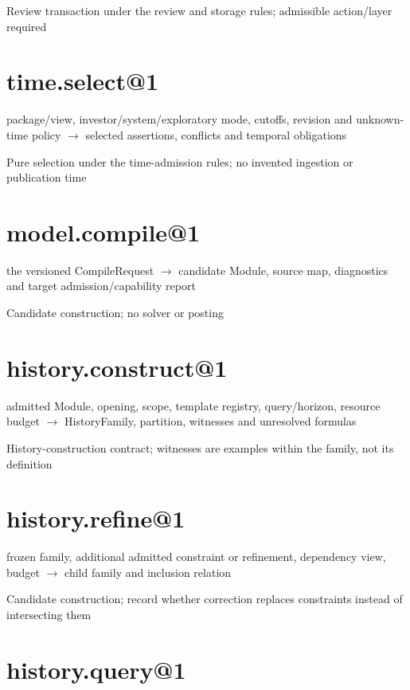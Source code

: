 Review transaction under the review and storage rules; admissible action/layer required

\hypertarget{time.select1}{%
\section{time.select@1}\label{time.select1}}

package/view, investor/system/exploratory mode, cutoffs, revision and unknown-time policy \ensuremath{\rightarrow} selected assertions, conflicts and temporal obligations

Pure selection under the time-admission rules; no invented ingestion or publication time

\hypertarget{model.compile1}{%
\section{model.compile@1}\label{model.compile1}}

the versioned CompileRequest \ensuremath{\rightarrow} candidate Module, source map, diagnostics and target admission/capability report

Candidate construction; no solver or posting

\hypertarget{history.construct1}{%
\section{history.construct@1}\label{history.construct1}}

admitted Module, opening, scope, template registry, query/horizon, resource budget \ensuremath{\rightarrow} HistoryFamily, partition, witnesses and unresolved formulas

History-construction contract; witnesses are examples within the family, not its definition

\hypertarget{history.refine1}{%
\section{history.refine@1}\label{history.refine1}}

frozen family, additional admitted constraint or refinement, dependency view, budget \ensuremath{\rightarrow} child family and inclusion relation

Candidate construction; record whether correction replaces constraints instead of intersecting them

\hypertarget{history.query1}{%
\section{history.query@1}\label{history.query1}}

